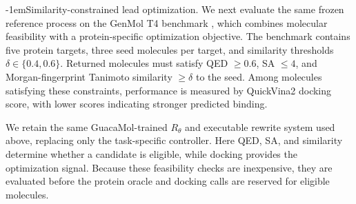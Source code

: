 \documentclass{article}
\makeatletter
\theoremstyle{definition}
\theoremstyle{remark}
\def\paragraph{\@startsection{paragraph}{4}{\z@}{1.0ex plus 0.3ex minus .2ex}%
  {-1em}{\normalsize\bf}}
\makeatother
\begin{document}
\paragraph{Similarity-constrained lead optimization.}
We next evaluate the same frozen reference process on the GenMol T4 benchmark
\citep{lee2025genmol}, which combines molecular feasibility with a
protein-specific optimization objective. The benchmark contains five protein
targets, three seed molecules per target, and similarity thresholds
$\delta\in\{0.4,0.6\}$. Returned molecules must satisfy QED $\geq 0.6$, SA
$\leq 4$, and Morgan-fingerprint Tanimoto similarity $\geq\delta$ to the seed.
Among molecules satisfying these constraints, performance is measured by
QuickVina2 docking score, with lower scores indicating stronger predicted
binding.

We retain the same GuacaMol-trained $R_\theta$ and executable rewrite system used
above, replacing only the task-specific controller. Here QED, SA, and similarity
determine whether a candidate is eligible, while docking provides the
optimization signal. Because these feasibility checks are inexpensive, they are
evaluated before the protein oracle and docking calls are reserved for eligible
molecules.
\end{document}
